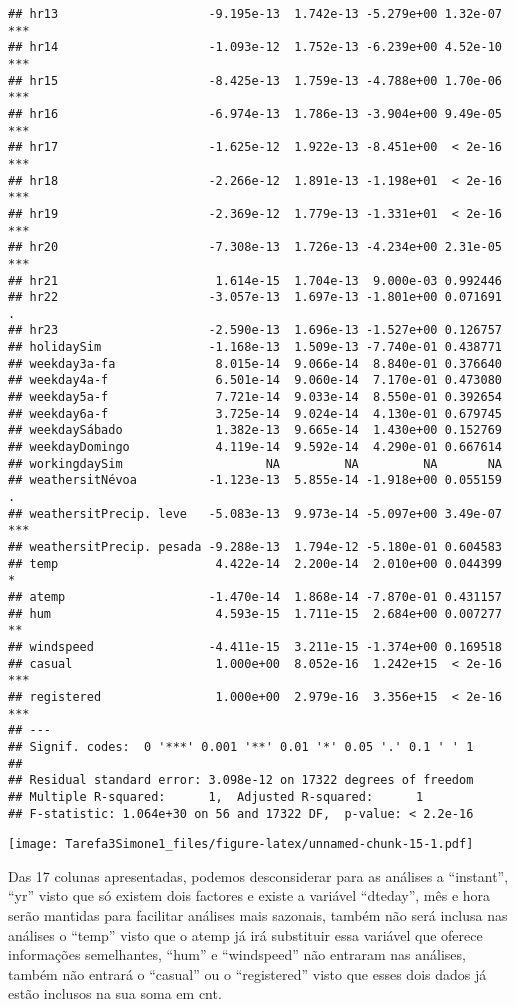 \documentclass[
]{article}
\begin{document}
\begin{verbatim}
## hr13                     -9.195e-13  1.742e-13 -5.279e+00 1.32e-07 ***
## hr14                     -1.093e-12  1.752e-13 -6.239e+00 4.52e-10 ***
## hr15                     -8.425e-13  1.759e-13 -4.788e+00 1.70e-06 ***
## hr16                     -6.974e-13  1.786e-13 -3.904e+00 9.49e-05 ***
## hr17                     -1.625e-12  1.922e-13 -8.451e+00  < 2e-16 ***
## hr18                     -2.266e-12  1.891e-13 -1.198e+01  < 2e-16 ***
## hr19                     -2.369e-12  1.779e-13 -1.331e+01  < 2e-16 ***
## hr20                     -7.308e-13  1.726e-13 -4.234e+00 2.31e-05 ***
## hr21                      1.614e-15  1.704e-13  9.000e-03 0.992446    
## hr22                     -3.057e-13  1.697e-13 -1.801e+00 0.071691 .  
## hr23                     -2.590e-13  1.696e-13 -1.527e+00 0.126757    
## holidaySim               -1.168e-13  1.509e-13 -7.740e-01 0.438771    
## weekday3a-fa              8.015e-14  9.066e-14  8.840e-01 0.376640    
## weekday4a-f               6.501e-14  9.060e-14  7.170e-01 0.473080    
## weekday5a-f               7.721e-14  9.033e-14  8.550e-01 0.392654    
## weekday6a-f               3.725e-14  9.024e-14  4.130e-01 0.679745    
## weekdaySábado             1.382e-13  9.665e-14  1.430e+00 0.152769    
## weekdayDomingo            4.119e-14  9.592e-14  4.290e-01 0.667614    
## workingdaySim                    NA         NA         NA       NA    
## weathersitNévoa          -1.123e-13  5.855e-14 -1.918e+00 0.055159 .  
## weathersitPrecip. leve   -5.083e-13  9.973e-14 -5.097e+00 3.49e-07 ***
## weathersitPrecip. pesada -9.288e-13  1.794e-12 -5.180e-01 0.604583    
## temp                      4.422e-14  2.200e-14  2.010e+00 0.044399 *  
## atemp                    -1.470e-14  1.868e-14 -7.870e-01 0.431157    
## hum                       4.593e-15  1.711e-15  2.684e+00 0.007277 ** 
## windspeed                -4.411e-15  3.211e-15 -1.374e+00 0.169518    
## casual                    1.000e+00  8.052e-16  1.242e+15  < 2e-16 ***
## registered                1.000e+00  2.979e-16  3.356e+15  < 2e-16 ***
## ---
## Signif. codes:  0 '***' 0.001 '**' 0.01 '*' 0.05 '.' 0.1 ' ' 1
## 
## Residual standard error: 3.098e-12 on 17322 degrees of freedom
## Multiple R-squared:      1,  Adjusted R-squared:      1 
## F-statistic: 1.064e+30 on 56 and 17322 DF,  p-value: < 2.2e-16
\end{verbatim}

\texttt{[image: Tarefa3Simone1\_files/figure-latex/unnamed-chunk-15-1.pdf]}

Das 17 colunas apresentadas, podemos desconsiderar para as análises a
``instant'', ``yr'' visto que só existem dois factores e existe a
variável ``dteday'', mês e hora serão mantidas para facilitar análises
mais sazonais, também não será inclusa nas análises o ``temp'' visto que
o atemp já irá substituir essa variável que oferece informações
semelhantes, ``hum'' e ``windspeed'' não entraram nas análises, também
não entrará o ``casual'' ou o ``registered'' visto que esses dois dados
já estão inclusos na sua soma em cnt.
\end{document}
